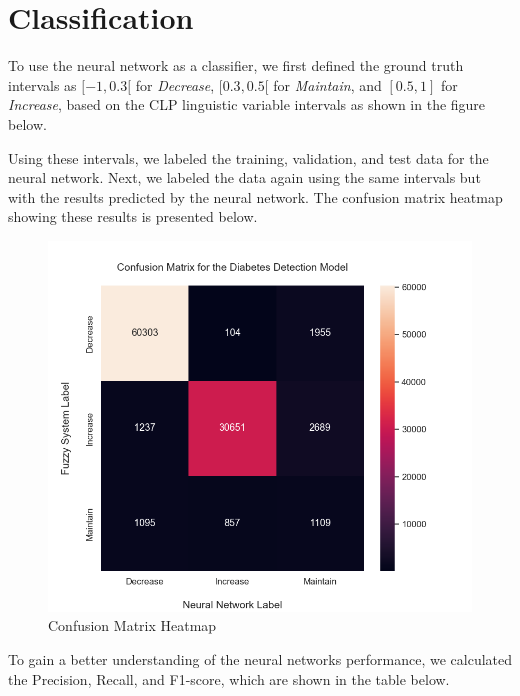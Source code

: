 \documentclass[11pt]{report}
\begin{document}
\section{Classification}

To use the neural network as a classifier, we first defined the ground truth intervals as \([-1, 0.3[\) for \emph{Decrease}, \([0.3, 0.5[\) for \emph{Maintain}, and \([0.5, 1]\) for \emph{Increase}, based on the CLP linguistic variable intervals as shown in the figure below.

Using these intervals, we labeled the training, validation, and test data for the neural network.
Next, we labeled the data again using the same intervals but with the results predicted by the neural network.
The confusion matrix heatmap showing these results is presented below.

\begin{figure}[H]
\includegraphics[width=\textwidth]{../images/classification/confusion_heatmap}
\caption{Confusion Matrix Heatmap}
\end{figure}

To gain a better understanding of the neural networks performance, we calculated the Precision, Recall, and F1-score, which are shown in the table below.

\begin{table}[H]
    \centering
    \caption{}
    \label{tab:classification_scores}
    
\end{table}
\end{document}
